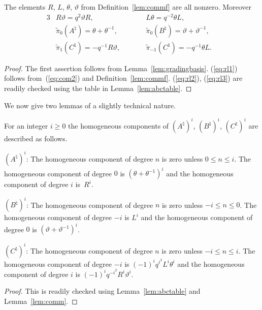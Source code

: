 \begin{Lemma}
\label{lem:comm}
The elements $R$, $L$, $\theta$, $\vartheta$ from
Definition~{\rm \ref{lem:commf}}
are all nonzero. Moreover
\begin{alignat}{3}
& R \vartheta = q^2 \vartheta R,
\qquad &&
L \theta = q^{-2} \theta L, &
\label{eq:rl1}
\\
&\tilde \pi_{0}(A^\natural) = \theta + \theta^{-1},
\qquad && \tilde \pi_{0}(B^\natural) = \vartheta + \vartheta^{-1}, &
\label{eq:rl2}
\\
&
\tilde \pi_{1}(C^\natural) =
-q^{-1} R \vartheta,
\qquad &&
\tilde \pi_{-1}(C^\natural) =
-q^{-1} \theta L.&
\label{eq:rl3}
\end{alignat}
\end{Lemma}
\begin{proof}
The f\/irst assertion
follows from
Lemma~\ref{lem:gradingbasis}.
(\ref{eq:rl1}) follows from~(\ref{eq:com2}) and
Def\/inition~\ref{lem:commf}.
(\ref{eq:rl2}),
(\ref{eq:rl3}) are readily checked using
the table in Lemma~\ref{lem:abctable}.
\end{proof}

We now give two lemmas of a slightly technical
nature.

\begin{Lemma}
\label{lem:aproj}
For an integer $i \geq 0$ the homogeneous components of
$
(A^\natural)^i$,
$(B^\natural)^i$,
$(C^\natural)^i$ are described as follows.

 $(A^\natural)^i$:
The homogeneous component of degree $n$ is zero unless
$0\leq n \leq i$.
The homogeneous component of degree $0$ is
$(\theta + \theta^{-1})^i$
and the homogeneous component of degree $i$ is~$R^i$.

 $(B^\natural)^i$:
The homogeneous component of degree $n$ is zero unless
$-i\leq n \leq 0$.
The homogeneous component of degree $-i$ is
$L^i$
and the
homogeneous component of degree $0$ is
$(\vartheta+ \vartheta^{-1})^i$.

$(C^\natural)^i$:
The homogeneous component of degree $n$ is zero unless
$-i\leq n \leq i$.
The homogeneous component of degree $-i$ is
$(-1)^iq^{i^2}L^i \theta^i$ and the
homogeneous component of degree $i$ is
$(-1)^iq^{-i^2}R^i \vartheta^i$.
\end{Lemma}
\begin{proof}
This is readily checked using
Lemma~\ref{lem:abctable} and
Lemma~\ref{lem:comm}.
\end{proof}




